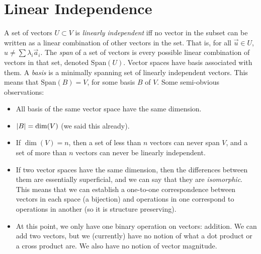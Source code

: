 \section{Linear Independence}
A set of vectors $U \subset V$ is \emph{linearly independent} iff no vector in the subset can be written as a linear combination of other vectors in the set. That is, for all $\vec{u} \in U$, $u \not= \sum \lambda_i\vec{a}_i$. The \emph{span} of a set of vectors is every possible linear combination of vectors in that set, denoted $\text{Span}(U)$. Vector spaces have basis associated with them. A \emph{basis} is a minimally spanning set of linearly independent vectors.
This means that $\text{Span}(B) = V$, for some basis $B$ of $V$.
Some semi-obvious observations:
\begin{itemize}
    \item All basis of the same vector space have the same dimension.
    \item $\abs{B} = \dim(V)$ (we said this already).
    \item If $\dim(V) = n$, then a set of less than $n$ vectors can never span $V$, and a set of more than $n$ vectors can never be linearly independent.
    \item If two vector spaces have the same dimension, then the differences between them are essentially superficial, and we can say that they are \emph{isomorphic}.
    This means that we can establish a one-to-one correspondence between vectors in each space (a bijection) and operations in one correspond to operations in another (so it is structure preserving).
    \item At this point, we only have one binary operation on vectors: addition. We can add two vectors, but we (currently) have no notion of what a dot product or a cross product are.
    We also have no notion of vector magnitude.
\end{itemize}
